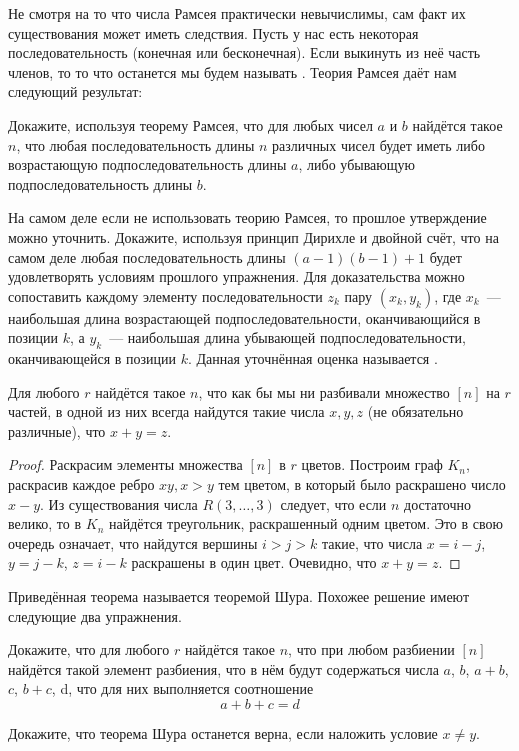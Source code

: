 Не смотря на то что числа Рамсея практически невычислимы, сам факт их существования может иметь следствия. Пусть у нас есть некоторая последовательность (конечная или бесконечная). Если выкинуть из неё часть членов, то то что останется мы будем называть . Теория Рамсея даёт нам следующий результат:

\begin{exercise}
Докажите, используя теорему Рамсея, что для любых чисел $a$ и $b$ найдётся такое $n$, что любая последовательность длины $n$ различных чисел  будет иметь либо возрастающую подпоследовательность длины $a$, либо убывающую подпоследовательность длины $b$.
\end{exercise}

\begin{exercise}
На самом деле если не использовать теорию Рамсея, то прошлое утверждение можно уточнить. Докажите, используя принцип Дирихле и двойной счёт, что на самом деле любая последовательность длины $(a-1)(b-1)+1$ будет удовлетворять условиям прошлого упражнения. Для доказательства можно сопоставить каждому элементу последовательности $z_k$ пару $(x_k, y_k)$, где $x_k$~--- наибольшая длина возрастающей подпоследовательности, оканчивающийся в позиции $k$, а $y_k$~--- наибольшая длина убывающей подпоследовательности, оканчивающейся в позиции $k$. Данная уточнённая оценка называется .
\end{exercise}

\begin{thm}
Для любого $r$ найдётся такое $n$, что как бы мы ни разбивали множество $[n]$ на $r$ частей, в одной из них всегда найдутся такие числа $x, y, z$ (не обязательно различные), что $x+y=z$.
\end{thm}
\begin{proof}
Раскрасим элементы множества $[n]$ в $r$ цветов. Построим граф $K_n$, раскрасив каждое ребро $xy, x>y$ тем цветом, в который было раскрашено число $x-y$. Из существования числа $R(3, \ldots, 3)$ следует, что если $n$ достаточно велико, то в $K_n$ найдётся треугольник, раскрашенный одним цветом. Это в свою очередь означает, что найдутся вершины $i> j> k$ такие, что числа $x=i-j$, $y=j-k$, $z=i-k$ раскрашены в один цвет. Очевидно, что $x + y = z$.
\end{proof}

Приведённая теорема называется теоремой Шура. Похожее решение имеют следующие два упражнения.

\begin{exercise}
Докажите, что для любого $r$ найдётся такое $n$, что при любом разбиении $[n]$ найдётся такой элемент разбиения, что в нём будут содержаться числа $a$, $b$, $a+b$, $c$, $b+c$, d, что для них выполняется соотношение
$$a+b+c = d$$
\end{exercise}

\begin{exercise}
Докажите, что теорема Шура останется верна, если наложить условие $x\not= y$.
\end{exercise}